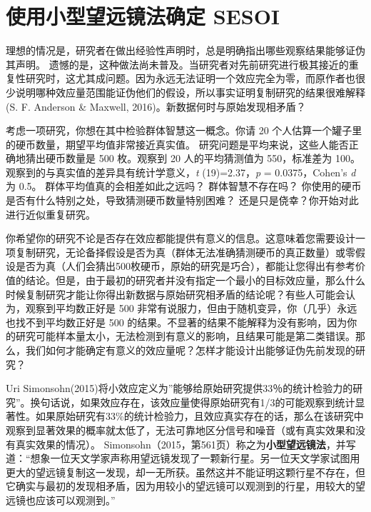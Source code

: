 \documentclass[
  letterpaper,
  DIV=11,
  numbers=noendperiod]{scrreprt}
\begin{document}
\hypertarget{ux4f7fux7528ux5c0fux578bux671bux8fdcux955cux6cd5ux786eux5b9a-sesoi}{%
\section{使用小型望远镜法确定
SESOI}\label{ux4f7fux7528ux5c0fux578bux671bux8fdcux955cux6cd5ux786eux5b9a-sesoi}}

理想的情况是，研究者在做出经验性声明时，总是明确指出哪些观察结果能够证伪其声明。
遗憾的是，这种做法尚未普及。当研究者对先前研究进行极其接近的重复性研究时，这尤其成问题。因为永远无法证明一个效应完全为零，而原作者也很少说明哪种效应量范围能证伪他们的假设，所以事实证明复制研究的结果很难解释(S.
F. Anderson \& Maxwell, 2016)。新数据何时与原始发现相矛盾？

考虑一项研究，你想在其中检验群体智慧这一概念。你请 20
个人估算一个罐子里的硬币数量，期望平均值非常接近真实值。
研究问题是平均来说，这些人能否正确地猜出硬币数量是 500 枚。观察到 20
人的平均猜测值为 550，标准差为
100。观察到的与真实值的差异具有统计学意义，\emph{t} (19)=2.37，\emph{p}
= 0.0375，Cohen's \emph{d} 为 0.5。 群体平均值真的会相差如此之远吗？
群体智慧不存在吗？
你使用的硬币是否有什么特别之处，导致猜测硬币数量特别困难？
还是只是侥幸？你开始对此进行近似重复研究。

你希望你的研究不论是否存在效应都能提供有意义的信息。这意味着您需要设计一项复制研究，无论备择假设是否为真（群体无法准确猜测硬币的真正数量）或零假设是否为真（人们会猜出500枚硬币，原始的研究是巧合），都能让您得出有参考价值的结论。但是，由于最初的研究者并没有指定一个最小的目标效应量，那么什么时候复制研究才能让你得出新数据与原始研究相矛盾的结论呢？有些人可能会认为，观察到平均数正好是
500 非常有说服力，但由于随机变异，你（几乎）永远也找不到平均数正好是 500
的结果。不显著的结果不能解释为没有影响，因为你的研究可能样本量太小，无法检测到有意义的影响，且结果可能是第二类错误。那么，我们如何才能确定有意义的效应量呢？怎样才能设计出能够证伪先前发现的研究？

Uri
Simonsohn(2015)将小效应定义为''能够给原始研究提供33％的统计检验力的研究''。换句话说，如果效应存在，该效应量使得原始研究有1/3的可能观察到统计显著性。如果原始研究有33\%的统计检验力，且效应真实存在的话，那么在该研究中观察到显著效果的概率就太低了，无法可靠地区分信号和噪音（或有真实效果和没有真实效果的情况）。
Simonsohn（2015，第561页）称之为\textbf{小型望远镜法}，并写道：``想象一位天文学家声称用望远镜发现了一颗新行星。另一位天文学家试图用更大的望远镜复制这一发现，却一无所获。虽然这并不能证明这颗行星不存在，但它确实与最初的发现相矛盾，因为用较小的望远镜可以观测到的行星，用较大的望远镜也应该可以观测到。''
\end{document}
